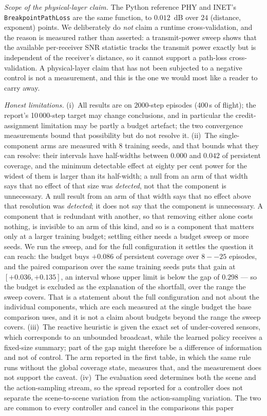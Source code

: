 \documentclass[conference]{IEEEtran}
\newcommand{\tokAblNSeeds}{8}
\newcommand{\tokAblResolution}{0.042}
\newcommand{\tokAblResolutionMin}{0.000}
\newcommand{\tokBudgetGap}{0.298}
\newcommand{\tokBudgetPairedCi}{[+0.036, +0.135]}
\newcommand{\tokBudgetRange}{8--25}
\newcommand{\tokBudgetSpread}{+0.086}
\newcommand{\tokEpisodeSeconds}{400}
\newcommand{\tokEpisodeSteps}{2000}
\newcommand{\tokPhyDelta}{0.012}
\newcommand{\tokPhyRows}{24}
\begin{document}
\emph{Scope of the physical-layer claim.} The Python reference PHY and INET's \texttt{BreakpointPathLoss} are the same function, to $\tokPhyDelta$~dB over $\tokPhyRows$ (distance, exponent) points. We deliberately do \emph{not} claim a runtime cross-validation, and the reason is measured rather than asserted: a transmit-power sweep shows that the available per-receiver SNR statistic tracks the transmit power exactly but is independent of the receiver's distance, so it cannot support a path-loss cross-validation. A physical-layer claim that has not been subjected to a negative control is not a measurement, and this is the one we would most like a reader to carry away.

\emph{Honest limitations.} (i)~All results are on $\tokEpisodeSteps$-step episodes (\tokEpisodeSeconds\,s of flight); the report's 10\,000-step target may change conclusions, and in particular the credit-assignment limitation may be partly a budget artefact; the two convergence measurements bound that possibility but do not resolve it. (ii)~The single-component arms are measured with $\tokAblNSeeds$ training seeds, and that bounds what they can resolve: their intervals have half-widths between $\tokAblResolutionMin$ and $\tokAblResolution$ of persistent coverage, and the minimum detectable effect at eighty per cent power for the widest of them is larger than its half-width; a null from an arm of that width says that no effect of that size was \emph{detected}, not that the component is unnecessary. A null result from an arm of that width says that no effect above that resolution was \emph{detected}; it does not say that the component is unnecessary. A component that is redundant with another, so that removing either alone costs nothing, is invisible to an arm of this kind, and so is a component that matters only at a larger training budget; settling either needs a budget sweep or more seeds. We run the sweep, and for the full configuration it settles the question it can reach: the budget buys $\tokBudgetSpread$ of persistent coverage over $\tokBudgetRange$ episodes, and the paired comparison over the same training seeds puts that gain at $\tokBudgetPairedCi$, an interval whose upper limit is below the gap of $\tokBudgetGap$ --- so the budget is excluded as the explanation of the shortfall, over the range the sweep covers. That is a statement about the full configuration and not about the individual components, which are each measured at the single budget the base comparison uses, and it is not a claim about budgets beyond the range the sweep covers. (iii)~The reactive heuristic is given the exact set of under-covered sensors, which corresponds to an unbounded broadcast, while the learned policy receives a fixed-size summary; part of the gap might therefore be a difference of information and not of control.  The arm reported in the first table, in which the same rule runs without the global coverage state, measures that, and the measurement does not support the caveat. (iv)~The evaluation seed determines both the scene and the action-sampling stream, so the spread reported for a controller does not separate the scene-to-scene variation from the action-sampling variation. The two are common to every controller and cancel in the comparisons this paper 
\end{document}
